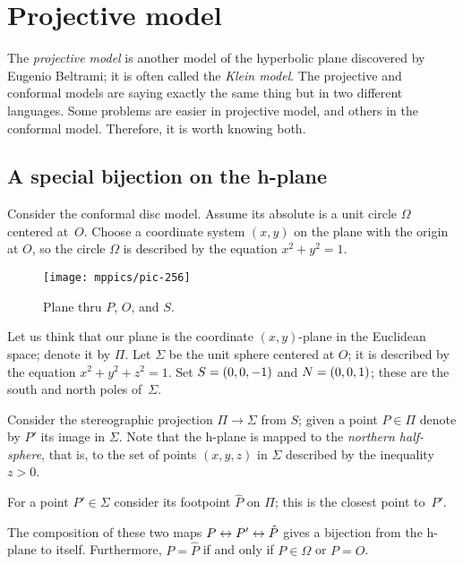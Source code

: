 \chapter{Projective model}\label{chap:klein}

The \textit{projective model} is another model of the hyperbolic plane discovered by Eugenio Beltrami; it is often called the {}\emph{Klein model}.
The projective and conformal models are saying exactly the same thing but in two different languages.
Some problems  are easier in projective model, and others in the conformal model.
Therefore, it is worth knowing both. 

\section{A special bijection on the h-plane}
\label{sec:special-bijection}

Consider the conformal disc model.
Assume its absolute is a unit circle $\Omega$ centered at~$O$.
Choose a coordinate system $(x,y)$ on the plane with the origin at $O$, 
so the circle $\Omega$ is described by the equation $x^2+y^2=1$.


\label{pic:stereographic_projection-klein}
\begin{wrapfigure}{o}{48mm}
\centering
\vskip-3mm
\texttt{[image: mppics/pic-256]}
\caption*{Plane thru $P$, $O$, and $S$.}
\vskip-3mm
\end{wrapfigure}

Let us think that our plane is the coordinate $(x,y)$-plane in the Euclidean space; denote it by $\Pi$.
Let $\Sigma$ be the unit sphere centered at $O$;
it is described by the equation 
$x^2+y^2+z^2=1$.
Set $S=(0,0,-1)$ and $N=(0,0,1)$; 
these are the south and north poles of~$\Sigma$.

Consider the stereographic projection $\Pi\to\Sigma$ from $S$;
given a point $P\in\Pi$ denote by $P'$ its image in $\Sigma$.
Note that the  h-plane is mapped to the {}\emph{northern half-sphere},
that is, to the set of points $(x,y,z)$ in $\Sigma$ described by the inequality~$z>0$.

For a point $P'\in \Sigma$ consider its footpoint $\hat P$
on $\Pi$;
this is the closest point to~$P'$.

The composition of these two maps $P\leftrightarrow P'\leftrightarrow\hat P$
gives a bijection from the h-plane to itself.
Furthermore, $P=\hat P$
 if and only if  $P\in \Omega$ or $P=O$.



